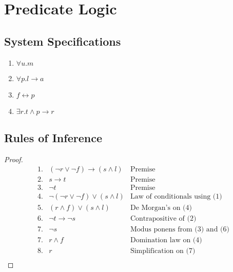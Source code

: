 \chapter{Predicate Logic}
\section{System Specifications}
\begin{enumerate}
    \item \(\forall u. m\)
    \item \(\forall p. l \rightarrow a\)
    \item \(f \leftrightarrow p\)
    \item \(\exists r. t \land p \rightarrow r\)
\end{enumerate}

\section{Rules of Inference}
\begin{proof}
    \begin{equation*}
        \begin{array}{rll}
            \text{1.} & (\neg r \lor \neg f) \rightarrow (s \land l) & \text{Premise}                       \\
            \text{2.} & s \rightarrow t                              & \text{Premise}                       \\
            \text{3.} & \neg t                                       & \text{Premise}                       \\
            \text{4.} & \neg(\neg r \lor \neg f) \lor (s \land l)    & \text{Law of conditionals using (1)} \\
            \text{5.} & (r \land f) \lor (s \land l)                 & \text{De Morgan's on (4)}            \\
            \text{6.} & \neg t \rightarrow \neg s                    & \text{Contrapositive of (2)}         \\
            \text{7.} & \neg s                                       & \text{Modus ponens from (3) and (6)} \\
            \text{7.} & r \land f                                    & \text{Domination law on (4)}         \\
            \text{8.} & r                                            & \text{Simplification on (7)}         \\
        \end{array}
    \end{equation*}
\end{proof}


